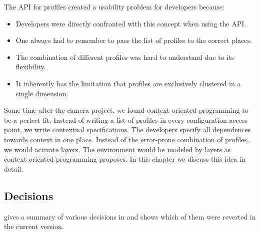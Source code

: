 The API for profiles created a usability problem for developers because:
\begin{itemize}
\item Developers were directly confronted with this concept when using the API.
\item One always had to remember to pass the list of profiles to the correct places.
\item The combination of different profiles was hard to understand due to its flexibility.
\item It inherently has the limitation that profiles are exclusively clustered in a single dimension.
\end{itemize}

Some time after the camera project, we found context-oriented programming to be a perfect fit.
Instead of writing a list of profiles in every configuration access point, we write contextual specifications.
The developers specify all dependences towards context in one place.
Instead of the error-prone combination of profiles, we would activate layers.
The environment would be modeled by layers as context-oriented programming proposes.
In this chapter we discuss this idea in detail.


\subsection{Decisions}

 gives a summary of various decisions in \elektra{} and shows which of them were reverted in the current version.

